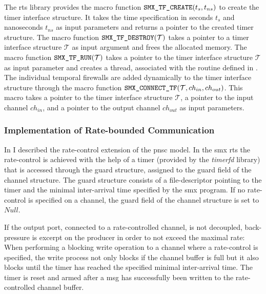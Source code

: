 The \gls{rts} library provides the macro function $\textnormal{\tt SMX\_TF\_CREATE}(t_{s}, t_{ns})$ to create the timer interface structure.
It takes the time specification in seconds $t_s$ and nanoseconds $t_{ns}$ as input parameters and returns a pointer to the created timer structure.
The macro function $\textnormal{\tt SMX\_TF\_DESTROY}(\mathcal{T})$ takes a pointer to a timer interface structure $\mathcal{T}$ as input argument and frees the allocated memory.
The macro function $\textnormal{\tt SMX\_TF\_RUN}(\mathcal{T})$ takes a pointer to the timer interface structure $\mathcal{T}$ as input parameter and creates a thread, associated with the routine defined in \Alg{\ref{alg_rts_timer}}.
The individual temporal firewalls are added dynamically to the timer interface structure through the macro function $\textnormal{\tt SMX\_CONNECT\_TF}(\mathcal{T}, ch_{in}, ch_{out})$.
This macro takes a pointer to the timer interface structure $\mathcal{T}$, a pointer to the input channel $ch_{in}$, and a pointer to the output channel $ch_{out}$ as input parameters.

\subsubsection{Implementation of Rate-bounded Communication}
\label{sect_tool_rts_ch_tb}
In \Sect{\ref{sect_cci_decoupling_rate}} I described the rate-control extension of the \gls{pnsc} model.
In the \gls*{smx} \gls{rts} the rate-control is achieved with the help of a timer (provided by the \emph{timerfd} library) that is accessed through the guard structure, assigned to the guard field of the channel structure.
The guard structure consists of a file-descriptor pointing to the timer and the minimal inter-arrival time specified by the \gls*{smx} program.
If no rate-control is specified on a channel, the guard field of the channel structure is set to $Null$.

If the output port, connected to a rate-controlled channel, is not decoupled, back-pressure is excerpt on the producer in order to not exceed the maximal rate:
When performing a blocking write operation to a channel where a rate-control is specified, the write process not only blocks if the channel buffer is full but it also blocks until the timer has reached the specified minimal inter-arrival time.
The timer is reset and armed after a \gls*{msg} has successfully been written to the rate-controlled channel buffer.


